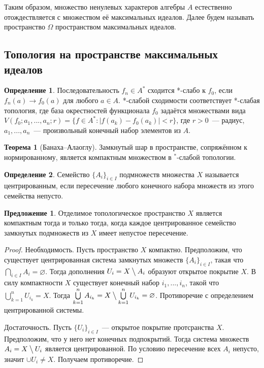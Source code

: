 \documentclass[12pt]{extarticle}
\renewcommand{\setminus}{\mathbin{\big\backslash}}%
\theoremstyle{definition}
\newtheorem{theorem}{\indent Теорема}[section]
\newtheorem{definition}{\indent Определение}[section]
\newtheorem{suggestion}{\indent Предложение}[section]
\begin{document}
    Таким образом, множество ненулевых характеров алгебры $A$ естественно отождествляется с множеством её максимальных идеалов. Далее будем называть пространство $\Omega$ пространством максимальных идеалов.

    \subsection{Топология на пространстве максимальных идеалов}

    \begin{definition}
        Последовательность $f_n \in A^*$ сходится *-слабо к $f_0$, если $f_n(a) \rightarrow f_0(a)$ для любого $a \in A$. *-слабой сходимости соответствует *-слабая топология, где база окрестностей функционала $f_0$ задаётся множествами вида $V(f_0; a_1, ..., a_n; r) = \{f \in A^*: |f(a_k) - f_0(a_k)| < r\}$, где $r>0$~--- радиус, $a_1, ..., a_n$~--- произвольный конечный набор элементов из $A$.
    \end{definition}
    \begin{theorem}[Банаха--Алаоглу]
        Замкнутый шар в пространстве, сопряжённом к нормированному, является компактным множеством в $^*$-слабой топологии.
    \end{theorem}
    \begin{definition}
        Семейство $\{A_i\}_{i \in I}$ подмножеств множества $X$ называется центрированным, если пересечение любого конечного набора множеств из этого семейства непусто.
    \end{definition}

    \begin{suggestion}
    Отделимое топологическое пространство $X$ является компактным тогда и только тогда, когда каждое центрированное семейство замкнутых подмножеств из $X$ имеет непустое пересечение.
    \end{suggestion}
    \begin{proof}
    Необходимость. Пусть пространство $X$ компактно. Предположим, что существует центрированная система замкнутых множеств $\{A_i\}_{i \in I}$, такая что $\bigcap \limits_{i \in I} A_i = \varnothing$. Тогда дополнения $U_i = X\setminus A_i$ образуют открытое покрытие $X$. В силу компактности $X$ существует конечный набор $i_1, ..., i_n$, такой что $\bigcup \limits_{k=1}^{n} U_{i_k} = X$. Тогда $\bigcup \limits_{k=1}^{n} A_{i_k} = X\setminus \bigcup \limits_{k=1}^{n} U_{i_k} = \varnothing$. Противоречие с определением центрированной системы.

    Достаточность. Пусть $\{U_i\}_{i \in I}$~--- открытое покрытие протсранства $X$. Предположим, что у него нет конечных подпокрытий. Тогда система множеств $A_i = X\setminus U_i$ является центрированной. По условию пересечение всех $A_i$ непусто, значит $\cup U_i \neq X$. Получаем противоречие.
    \end{proof}
\end{document}
